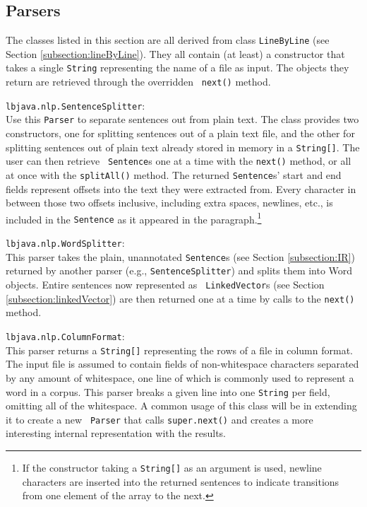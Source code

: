 \subsection{Parsers} \label{subsection:parsers}

The classes listed in this section are all derived from class {\tt LineByLine}
(see Section \ref{subsection:lineByLine}).  They all contain (at least) a
constructor that takes a single {\tt String} representing the name of a file
as input.  The objects they return are retrieved through the overridden {\tt
next()} method.

\begin{list}{}{}
\item[{\tt lbjava.nlp.SentenceSplitter}:] ~\\
Use this {\tt Parser} to separate sentences out from plain text.  The class
provides two constructors, one for splitting sentences out of a plain text
file, and the other for splitting sentences out of plain text already stored
in memory in a {\tt String[]}.  The user can then retrieve {\tt
Sentence}s one at a time with the {\tt next()} method, or all at once with
the {\tt splitAll()} method.  The returned {\tt Sentence}s' start and end
fields represent offsets into the text they were extracted from.  Every
character in between those two offsets inclusive, including extra spaces,
newlines, etc., is included in the {\tt Sentence} as it appeared in the
paragraph.\footnote{If the constructor taking a {\tt String[]} as an
argument is used, newline characters are inserted into the returned sentences
to indicate transitions from one element of the array to the next.}

\item[{\tt lbjava.nlp.WordSplitter}:] ~\\
This parser takes the plain, unannotated {\tt Sentence}s (see Section
\ref{subsection:IR}) returned by another parser (e.g., {\tt SentenceSplitter})
and splits them into Word objects.  Entire sentences now represented as {\tt
LinkedVector}s (see Section \ref{subsection:linkedVector}) are then returned
one at a time by calls to the {\tt next()} method.

\item[{\tt lbjava.nlp.ColumnFormat}:] ~\\
This parser returns a {\tt String[]} representing the rows of a file in column
format.  The input file is assumed to contain fields of non-whitespace
characters separated by any amount of whitespace, one line of which is
commonly used to represent a word in a corpus.  This parser breaks a given
line into one {\tt String} per field, omitting all of the whitespace.  A
common usage of this class will be in extending it to create a new {\tt
Parser} that calls {\tt super.next()} and creates a more interesting internal
representation with the results.


\end{list}
